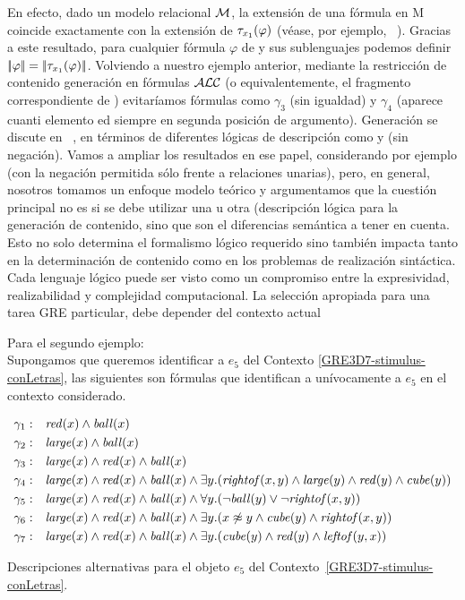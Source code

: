 En efecto, dado un modelo relacional $\mathcal{M}$, la extensi\'on de una f\'ormula \ALC en M coincide exactamente con la extensi\'on de $\mathit{\tau}_{x_1}(\varphi)$ (v\'ease, por ejemplo, ~\cite{baad:desc03}). Gracias
a este resultado, para cualquier f\'ormula $\varphi$ de \ALC y sus sublenguajes podemos definir $|\!|\varphi|\!| = |\!|\mathit{\tau}_{x_1}(\varphi)|\!|$.
 Volviendo a nuestro ejemplo anterior, mediante la restricci\'on de contenido
generaci\'on en f\'ormulas $\mathcal{ALC}$ (o equivalentemente, el fragmento correspondiente de \FOL)
evitar\'iamos f\'ormulas como
$\gamma_3$ (sin igualdad) y
$\gamma_4$ (aparece cuanti elemento ed
siempre en segunda posici\'on de argumento).
Generaci\'on se discute en ~\cite{arec2:2008:Areces}, en t\'erminos de diferentes l\'ogicas de descripci\'on como \ALC
y \EL (\ALC sin negaci\'on). Vamos a ampliar los resultados en ese papel, considerando por ejemplo \ELAN (\ALC con la negaci\'on permitida s\'olo frente a relaciones unarias), pero, en general, nosotros tomamos un enfoque modelo te\'orico y argumentamos que la cuesti\'on principal no es si se debe utilizar una u otra (descripci\'on l\'ogica para la generaci\'on de contenido, sino que son el diferencias sem\'antica a tener en cuenta. Esto no solo determina el formalismo l\'ogico requerido sino tambi\'en impacta tanto en la determinaci\'on de contenido como en los problemas de realizaci\'on sint\'actica. Cada
lenguaje l\'ogico puede ser visto como un compromiso entre la expresividad, realizabilidad y complejidad computacional. La selecci\'on apropiada para una tarea GRE particular, debe depender del contexto actual




Para el segundo ejemplo: \\
Supongamos que queremos identificar a $e_5$ del Contexto \ref{GRE3D7-stimulus-conLetras}, las siguientes son f\'ormulas que identifican a un\'ivocamente a $e_5$ en el contexto considerado.

\begin{table}
$$
\begin{array}{cl}
 \gamma_1: & \mathit{red}(x) \land \mathit{ball}(x)\\[3pt]
 \gamma_2: & \mathit{large}(x) \land \mathit{ball}(x)\\[3pt]
 \gamma_3: & \mathit{large}(x) \land \mathit{red}(x) \land \mathit{ball}(x)\\[3pt]
 \gamma_4: & \mathit{large}(x) \land \mathit{red}(x) \land \mathit{ball}(x) \land
   \exists y . (\mathit{rightof}(x,y) \land \mathit{large}(y) \land \mathit{red}(y) \land \mathit{cube}(y))\\[3pt]
 \gamma_5: & \mathit{large}(x) \land \mathit{red}(x) \land \mathit{ball}(x) \land
  \forall y . (\neg \mathit{ball}(y) \lor \neg \mathit{rightof}(x,y))\\[3pt]
 \gamma_6: & \mathit{large}(x) \land \mathit{red}(x) \land \mathit{ball}(x) \land
  \exists y . (x \not\approx y \land \mathit{cube}(y) \land \mathit{rightof}(x,y))\\[3pt]
 \gamma_7: & \mathit{large}(x) \land \mathit{red}(x) \land \mathit{ball}(x) \land
  \exists y . (\mathit{cube}(y) \land \mathit{red}(y) \land \mathit{leftof}(y,x))
 \end{array}
$$
\caption{Descripciones alternativas para el objeto $e_5$ del Contexto~\ref{GRE3D7-stimulus-conLetras}.}\label{tab:gammas}
\end{table}

